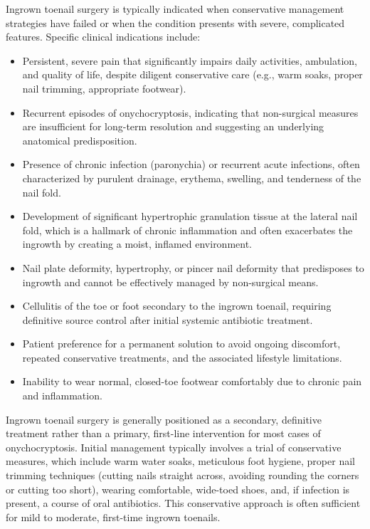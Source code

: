 Ingrown toenail surgery is typically indicated when conservative management strategies have failed or when the condition presents with severe, complicated features. Specific clinical indications include:
\begin{itemize}
  \item Persistent, severe pain that significantly impairs daily activities, ambulation, and quality of life, despite diligent conservative care (e.g., warm soaks, proper nail trimming, appropriate footwear).
  \item Recurrent episodes of onychocryptosis, indicating that non-surgical measures are insufficient for long-term resolution and suggesting an underlying anatomical predisposition.
  \item Presence of chronic infection (paronychia) or recurrent acute infections, often characterized by purulent drainage, erythema, swelling, and tenderness of the nail fold.
  \item Development of significant hypertrophic granulation tissue at the lateral nail fold, which is a hallmark of chronic inflammation and often exacerbates the ingrowth by creating a moist, inflamed environment.
  \item Nail plate deformity, hypertrophy, or pincer nail deformity that predisposes to ingrowth and cannot be effectively managed by non-surgical means.
  \item Cellulitis of the toe or foot secondary to the ingrown toenail, requiring definitive source control after initial systemic antibiotic treatment.
  \item Patient preference for a permanent solution to avoid ongoing discomfort, repeated conservative treatments, and the associated lifestyle limitations.
  \item Inability to wear normal, closed-toe footwear comfortably due to chronic pain and inflammation.
\end{itemize}

Ingrown toenail surgery is generally positioned as a secondary, definitive treatment rather than a primary, first-line intervention for most cases of onychocryptosis. Initial management typically involves a trial of conservative measures, which include warm water soaks, meticulous foot hygiene, proper nail trimming techniques (cutting nails straight across, avoiding rounding the corners or cutting too short), wearing comfortable, wide-toed shoes, and, if infection is present, a course of oral antibiotics. This conservative approach is often sufficient for mild to moderate, first-time ingrown toenails.

